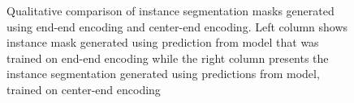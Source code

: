 \begin{figure}[H]
{        \label{fig:O4A}}
    \caption[Qualitative Comparison of Encodings] {Qualitative comparison of instance segmentation masks generated using end-end encoding and center-end encoding. Left column shows instance mask generated using prediction from model that was trained on end-end encoding while the right column presents the instance segmentation generated using predictions from model, trained on center-end encoding}
    \label{fig:Encodings_comparison}
\end{figure}


